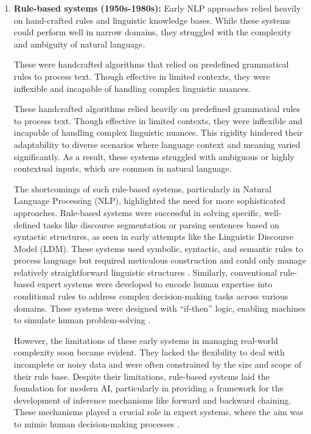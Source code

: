 \begin{enumerate}
    \item \textbf{Rule-based systems (1950s-1980s):} Early NLP approaches relied heavily on hand-crafted rules and linguistic knowledge bases. While these systems could perform well in narrow domains, they struggled with the complexity and ambiguity of natural language.

    These were handcrafted algorithms that relied on predefined grammatical rules to process text. Though effective in limited contexts, they were inflexible and incapable of handling complex linguistic nuances.

These handcrafted algorithms relied heavily on predefined grammatical rules to process text. Though effective in limited contexts, they were inflexible and incapable of handling complex linguistic nuances. This rigidity hindered their adaptability to diverse scenarios where language context and meaning varied significantly. As a result, these systems struggled with ambiguous or highly contextual inputs, which are common in natural language.

The shortcomings of such rule-based systems, particularly in Natural Language Processing (NLP), highlighted the need for more sophisticated approaches. Rule-based systems were successful in solving specific, well-defined tasks like discourse segmentation or parsing sentences based on syntactic structures, as seen in early attempts like the Linguistic Discourse Model (LDM). These systems used symbolic, syntactic, and semantic rules to process language but required meticulous construction and could only manage relatively straightforward linguistic structures \cite{polanyi2004rule}. Similarly, conventional rule-based expert systems were developed to encode human expertise into conditional rules to address complex decision-making tasks across various domains. These systems were designed with “if-then” logic, enabling machines to simulate human problem-solving \cite{abraham2005rule}.

However, the limitations of these early systems in managing real-world complexity soon became evident. They lacked the flexibility to deal with incomplete or noisy data and were often constrained by the size and scope of their rule base. Despite their limitations, rule-based systems laid the foundation for modern AI, particularly in providing a framework for the development of inference mechanisms like forward and backward chaining. These mechanisms played a crucial role in expert systems, where the aim was to mimic human decision-making processes \cite{abraham2005rule}.


\end{enumerate}
